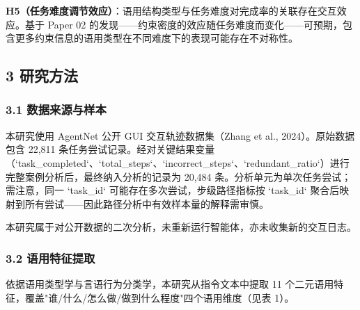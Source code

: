 \documentclass[12pt,a4paper,openany,oneside]{ctexrep}
\begin{document}
\textbf{H5（任务难度调节效应）}：语用结构类型与任务难度对完成率的关联存在交互效应。基于 Paper 02 的发现——约束密度的效应随任务难度而变化——可预期，包含更多约束信息的语用类型在不同难度下的表现可能存在不对称性。

\subsection{3 研究方法}


\subsubsection{3.1 数据来源与样本}


本研究使用 AgentNet 公开 GUI 交互轨迹数据集（Zhang et al., 2024）。原始数据包含 22,811 条任务尝试记录。经对关键结果变量（`task\_completed`、`total\_steps`、`incorrect\_steps`、`redundant\_ratio`）进行完整案例分析后，最终纳入分析的记录为 20,484 条。分析单元为单次任务尝试；需注意，同一 `task\_id` 可能存在多次尝试，步级路径指标按 `task\_id` 聚合后映射到所有尝试——因此路径分析中有效样本量的解释需审慎。

本研究属于对公开数据的二次分析，未重新运行智能体，亦未收集新的交互日志。

\subsubsection{3.2 语用特征提取}


依据语用类型学与言语行为分类学，本研究从指令文本中提取 11 个二元语用特征，覆盖"谁/什么/怎么做/做到什么程度"四个语用维度（见表 1）。


\begin{table}[htbp]
\centering
\caption{表 1：11 个二元语用特征的定义与语用维度}
\small
{}
\end{table}
\end{document}

